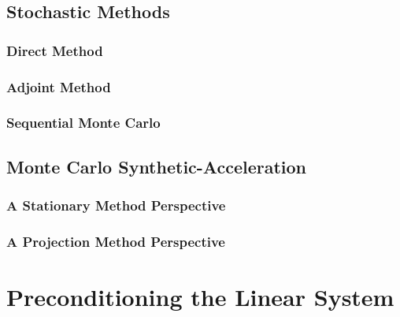 \subsection{Stochastic Methods}
\label{subsec:stochastic_methods}

\subsubsection{Direct Method}
\label{subsubsec:direct_mc}

\subsubsection{Adjoint Method}
\label{subsubsec:adjoint_mc}

\subsubsection{Sequential Monte Carlo}
\label{subsusbsec:sequential_mc}

\subsection{Monte Carlo Synthetic-Acceleration}
\label{subsec:mcsa}

\subsubsection{A Stationary Method Perspective}
\label{subsubsec:mcsa_stationary}

\subsubsection{A Projection Method Perspective}
\label{subsubsec:mcsa_projection}

\section{Preconditioning the Linear System}
\label{sec:linear_preconditioning}

